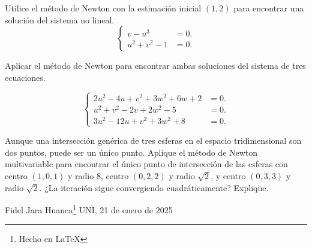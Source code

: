 \begin{questions}

    \question

    Utilice el método de Newton con la estimación inicial
    $\left(1,2\right)$ para encontrar una solución del sistema no
    lineal.
    \begin{equation*}
        \left\{
        \begin{aligned}
            v-u^{3}       & =0. \\
            u^{2}+v^{2}-1 & =0.
        \end{aligned}
        \right.
    \end{equation*}

    \question

    Aplicar el método de Newton para encontrar ambas soluciones del
    sistema de tres ecuaciones.

    \begin{equation*}
        \left\{
        \begin{aligned}
            2u^{2}-4u+v^{2}+3w^{2}+6w+2 & =0. \\
            u^{2}+v^{2}-2v+2w^{2}-5     & =0. \\
            3u^{2}-12u+v^{2}+3w^{2}+8   & =0.
        \end{aligned}
        \right.
    \end{equation*}

    \question

    Aunque una intersección genérica de tres esferas en el espacio
    tridimensional son dos puntos, puede ser un único punto.
    Aplique el método de Newton multivariable para encontrar el único
    punto de intersección de las esferas con centro $\left(1,0,1\right)$
    y radio $8$, centro $\left(0,2,2\right)$ y radio $\sqrt{2}$,
    y centro $\left(0,3,3\right)$ y radio $\sqrt{2}$.
    ¿La iteración sigue convergiendo cuadráticamente? Explique.
\end{questions}

\vfill{Fidel Jara Huanca}\footnote{Hecho en \LaTeX}
\hfill{UNI, 21 de enero de 2025}

